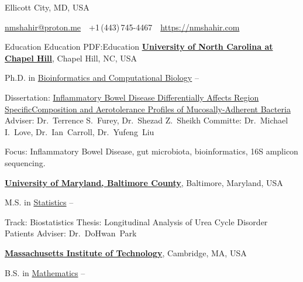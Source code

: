 \documentclass[letterpaper,MMMyyyy,nonstopmode]{simpleresumecv}
\newcommand{\CVAuthor}{Nur M Shahir, PhD}
\newcommand{\CVWebpage}{https://nmshahir.com}
\begin{document}

\Title{\CVAuthor}

\begin{SubTitle}
{Ellicott City, MD, USA}
\par
\href{mailto:nmshahir@proton.me}
{nmshahir@proton.me}
\,\SubBulletSymbol\,
+1\,(443)\,745-4467
\,\SubBulletSymbol\,
\href{\CVWebpage}
{\url{\CVWebpage}}
\end{SubTitle}

\begin{Body}


\Section
{Education}
{Education}
{PDF:Education}
\Entry
\href{http://www.unc.edu/}
{\textbf{University of North Carolina at Chapel Hill}},
Chapel Hill, NC, USA

\Gap
\BulletItem
Ph.D. in
\href{https://bcb.unc.edu/}
{Bioinformatics and Computational Biology}
\hfill
{} --
\begin{Detail}
\SubBulletItem
Dissertation:
\href{https://cdr.lib.unc.edu/concern/dissertations/z029pb27b}
{Inflammatory Bowel Disease Differentially Affects Region Specific\newline Composition and Aerotolerance Profiles of Mucosally-Adherent Bacteria}
\SubBulletItem
Adviser:
Dr.~Terrence S.~Furey, Dr.~Shezad Z.~Sheikh
\SubBulletItem
Committe:
Dr.~Michael I.~Love, Dr.~Ian~Carroll, Dr.~Yufeng~Liu

\SubBulletItem
Focus:
Inflammatory Bowel Disease, gut microbiota, bioinformatics, 16S amplicon sequencing.
\end{Detail}


\BigGap
\Entry
\href{https://umbc.edu/}
{\textbf{University of Maryland, Baltimore County}},
Baltimore, Maryland, USA

\Gap
\BulletItem
M.S. in
\href{https://mathstat.umbc.edu/}
{Statistics}
\hfill
{} --
\begin{Detail}
\SubBulletItem
Track: Biostatistics
\SubBulletItem
Thesis: Longitudinal Analysis of Urea Cycle Disorder Patients
\SubBulletItem
Adviser: Dr.~DoHwan~Park
\end{Detail}

\BigGap
\Entry
\href{https://web.mit.edu/}
{\textbf{Massachusetts Institute of Technology}},
Cambridge, MA, USA

\Gap
\BulletItem
B.S. in
\href{https://math.mit.edu/}
{Mathematics}
\hfill
{} --


\end{Body}
\end{document}
